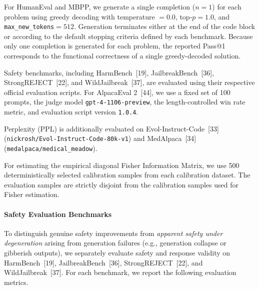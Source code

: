 For HumanEval and MBPP, we generate a single completion ($n=1$) for each problem using greedy decoding with temperature $=0.0$, top-$p=1.0$, and \texttt{max\_new\_tokens}$=512$. Generation terminates either at the end of the code block or according to the default stopping criteria defined by each benchmark. Because only one completion is generated for each problem, the reported Pass@1 corresponds to the functional correctness of a single greedy-decoded solution.

Safety benchmarks, including HarmBench~[19], JailbreakBench~[36], StrongREJECT~[22], and WildJailbreak~[37], are evaluated using their respective official evaluation scripts. For AlpacaEval 2~[44], we use a fixed set of 100 prompts, the judge model \texttt{gpt-4-1106-preview}, the length-controlled win rate metric, and evaluation script version \texttt{1.0.4}.

Perplexity (PPL) is additionally evaluated on Evol-Instruct-Code~[33] (\texttt{nickrosh/Evol-Instruct-Code-80k-v1}) and MedAlpaca~[34] (\texttt{medalpaca/medical\_meadow}).

For estimating the empirical diagonal Fisher Information Matrix, we use 500 deterministically selected calibration samples from each calibration dataset. The evaluation samples are strictly disjoint from the calibration samples used for Fisher estimation.


\paragraph{Safety Evaluation Benchmarks}
To distinguish genuine safety improvements from \emph{apparent safety under degeneration} arising from generation failures (e.g., generation collapse or gibberish outputs), we separately evaluate safety and response validity on HarmBench~[19], JailbreakBench~[36], StrongREJECT~[22], and WildJailbreak~[37]. For each benchmark, we report the following evaluation metrics.




